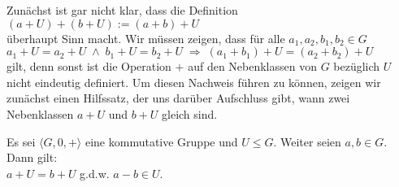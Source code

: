 \remark
Zun\"{a}chst ist gar nicht klar, dass die Definition
\\[0.2cm]
\hspace*{1.3cm}
  $(a + U) + (b + U) := (a + b) + U$
\\[0.2cm]
\"{u}berhaupt Sinn macht.  Wir m\"{u}ssen zeigen, dass f\"{u}r alle $a_1,a_2, b_1, b_2 \in G$
\\[0.2cm]
\hspace*{1.3cm}
$a_1 + U = a_2 + U \;\wedge\; b_1 + U = b_2 + U \;\Rightarrow\; (a_1 + b_1) + U = (a_2 + b_2) + U$
\\[0.2cm]
gilt, denn sonst ist die Operation $+$ auf den Nebenklassen von $G$ bez\"{u}glich $U$ nicht eindeutig
definiert.  Um diesen Nachweis f\"{u}hren zu k\"{o}nnen, zeigen wir zun\"{a}chst einen Hilfssatz, der uns dar\"{u}ber
Aufschluss gibt, wann zwei Nebenklassen $a + U$ und $b + U$ gleich sind.
\eox
\pagebreak


\begin{Lemma}
  Es sei $\langle G, 0, + \rangle$ eine kommutative Gruppe und $U \leq G$.
  Weiter seien $a,b \in G$.  Dann gilt:
  \\[0.2cm]
  \hspace*{1.3cm}
  $a + U = b + U$ \quad g.d.w. \quad $a - b \in U$.
\end{Lemma}

